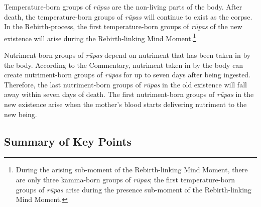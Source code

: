 Temperature-born groups of \textit{rūpas} are the non-living parts of the body. After death, the temperature-born groups of \textit{rūpas} will continue to exist as the corpse. In the Rebirth-process, the first temperature-born groups of \textit{rūpas} of the new existence will arise during the Rebirth-linking Mind Moment.\footnote{During the arising sub-moment of the Rebirth-linking Mind Moment, there are only three kamma-born groups of \textit{rūpas}; the first temperature-born groups of \textit{rūpas} arise during the presence sub-moment of the Rebirth-linking Mind Moment.}

Nutriment-born groups of \textit{rūpas} depend on nutriment that has been taken in by the body. According to the Commentary, nutriment taken in by the body can create nutriment-born groups of \textit{rūpas} for up to seven days after being ingested. Therefore, the last nutriment-born groups of \textit{rūpas} in the old existence will fall away within seven days of death. The first nutriment-born groups of \textit{rūpas} in the new existence arise when the mother’s blood starts delivering nutriment to the new being.

\pagebreak

\subsection*{Summary of Key Points}

